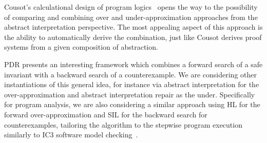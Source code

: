 Cousot's calculational design of program logics~\cite{Cousot24} opens the way to the possibility of comparing and combining over and under-approximation approaches from the abstract interpretation perspective. The most appealing aspect of this approach is the ability to automatically derive the combination, just like Cousot derives proof systems from a given composition of abstraction.

PDR presents an interesting framework which combines a forward search of a safe invariant with a backward search of a counterexample. We are considering other instantiations of this general idea, for instance via abstract interpretation for the over-approximation and abstract interpretation repair as the under. Specifically for program analysis, we are also considering a similar approach using HL for the forward over-approximation and SIL for the backward search for counterexamples, tailoring the algorithm to the stepwise program execution similarly to IC3 software model checking~\cite{LNNK20}.
